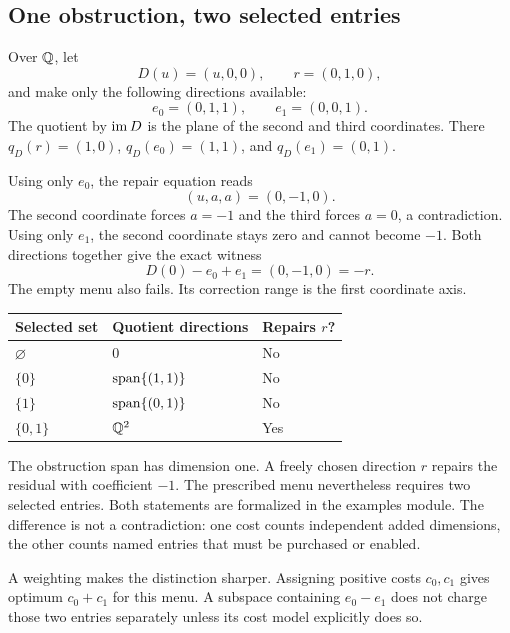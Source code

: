 \subsection{One obstruction, two selected entries}
\begin{CRexample}\label{CR:ex:menu}
Over $\mathbb{Q}$, let
\[
D(u)=(u,0,0),\qquad r=(0,1,0),
\]
and make only the following directions available:
\[
e_0=(0,1,1),\qquad e_1=(0,0,1).
\]
The quotient by $\operatorname{im} D$ is the plane of the second and third coordinates. There $q_D(r)=(1,0)$, $q_D(e_0)=(1,1)$, and $q_D(e_1)=(0,1)$.
\end{CRexample}

Using only $e_0$, the repair equation reads
\[
(u,a,a)=(0,-1,0).
\]
The second coordinate forces $a=-1$ and the third forces $a=0$, a contradiction. Using only $e_1$, the second coordinate stays zero and cannot become $-1$. Both directions together give the exact witness
\begin{equation}\label{CR:eq:two-entry-witness}
D(0)-e_0+e_1=(0,-1,0)=-r.
\end{equation}
The empty menu also fails. Its correction range is the first coordinate axis.

\begin{center}
\begin{tabular}{@{}lll@{}}
\toprule
Selected set & Quotient directions & Repairs $r$?\\
\midrule
$\varnothing$ & $0$ & No\\
$\{0\}$ & $\operatorname{span}\{(1,1)\}$ & No\\
$\{1\}$ & $\operatorname{span}\{(0,1)\}$ & No\\
$\{0,1\}$ & $\mathbb{Q}^2$ & Yes\\
\bottomrule
\end{tabular}
\end{center}

The obstruction span has dimension one. A freely chosen direction $r$ repairs the residual with coefficient $-1$. The prescribed menu nevertheless requires two selected entries. Both statements are formalized in the examples module. The difference is not a contradiction: one cost counts independent added dimensions, the other counts named entries that must be purchased or enabled.

A weighting makes the distinction sharper. Assigning positive costs $c_0,c_1$ gives optimum $c_0+c_1$ for this menu. A subspace containing $e_0-e_1$ does not charge those two entries separately unless its cost model explicitly does so.

